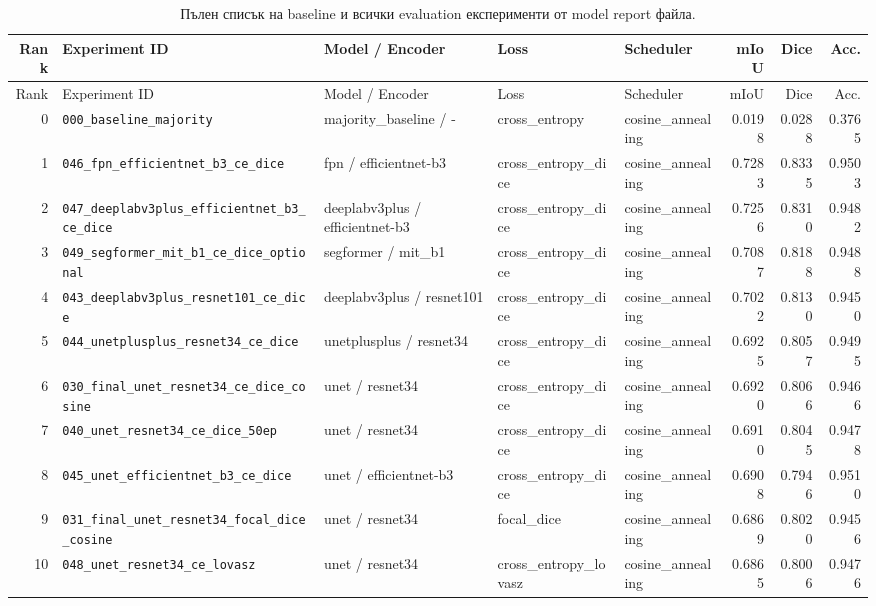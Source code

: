 \documentclass[12pt,a4paper]{article}
\begin{document}
\begin{landscape}
\begingroup
\scriptsize
\setlength{\tabcolsep}{3pt}
\begin{longtable}{r p{7.0cm} p{4.2cm} p{3.0cm} p{3.2cm} r r r}
\caption{Пълен списък на baseline и всички evaluation експерименти от model report файла.}\\
\toprule
Rank & Experiment ID & Model / Encoder & Loss & Scheduler & mIoU & Dice & Acc. \\
\midrule
\endfirsthead
\toprule
Rank & Experiment ID & Model / Encoder & Loss & Scheduler & mIoU & Dice & Acc. \\
\midrule
\endhead
0 & \texttt{000\_baseline\_majority} & majority\_baseline / - & cross\_entropy & cosine\_annealing & 0.0198 & 0.0288 & 0.3765 \\
1 & \texttt{046\_fpn\_efficientnet\_b3\_ce\_dice} & fpn / efficientnet-b3 & cross\_entropy\_dice & cosine\_annealing & 0.7283 & 0.8335 & 0.9503 \\
2 & \texttt{047\_deeplabv3plus\_efficientnet\_b3\_ce\_dice} & deeplabv3plus / efficientnet-b3 & cross\_entropy\_dice & cosine\_annealing & 0.7256 & 0.8310 & 0.9482 \\
3 & \texttt{049\_segformer\_mit\_b1\_ce\_dice\_optional} & segformer / mit\_b1 & cross\_entropy\_dice & cosine\_annealing & 0.7087 & 0.8188 & 0.9488 \\
4 & \texttt{043\_deeplabv3plus\_resnet101\_ce\_dice} & deeplabv3plus / resnet101 & cross\_entropy\_dice & cosine\_annealing & 0.7022 & 0.8130 & 0.9450 \\
5 & \texttt{044\_unetplusplus\_resnet34\_ce\_dice} & unetplusplus / resnet34 & cross\_entropy\_dice & cosine\_annealing & 0.6925 & 0.8057 & 0.9495 \\
6 & \texttt{030\_final\_unet\_resnet34\_ce\_dice\_cosine} & unet / resnet34 & cross\_entropy\_dice & cosine\_annealing & 0.6920 & 0.8066 & 0.9466 \\
7 & \texttt{040\_unet\_resnet34\_ce\_dice\_50ep} & unet / resnet34 & cross\_entropy\_dice & cosine\_annealing & 0.6910 & 0.8045 & 0.9478 \\
8 & \texttt{045\_unet\_efficientnet\_b3\_ce\_dice} & unet / efficientnet-b3 & cross\_entropy\_dice & cosine\_annealing & 0.6908 & 0.7946 & 0.9510 \\
9 & \texttt{031\_final\_unet\_resnet34\_focal\_dice\_cosine} & unet / resnet34 & focal\_dice & cosine\_annealing & 0.6869 & 0.8020 & 0.9456 \\
10 & \texttt{048\_unet\_resnet34\_ce\_lovasz} & unet / resnet34 & cross\_entropy\_lovasz & cosine\_annealing & 0.6865 & 0.8006 & 0.9476 \\

\end{longtable}
\end{landscape}
\end{document}
